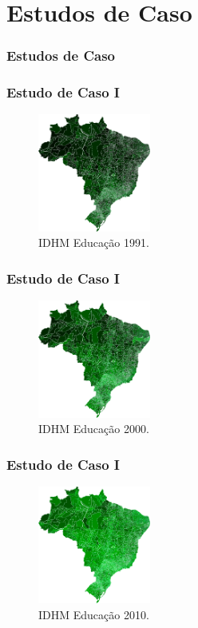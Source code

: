 \documentclass[aspectratio=169]{beamer}
\begin{document}
\section{Estudos de Caso}
\begin{frame}
\frametitle{Estudos de Caso}
\justifying


\end{frame}

\begin{frame}
\frametitle{Estudo de Caso I}
\justifying

\begin{figure}
\centering
\includegraphics[width=0.33\textwidth]{images/educacao-1991.png}
\caption{IDHM Educação 1991.}
\end{figure}


\end{frame}

\begin{frame}
\frametitle{Estudo de Caso I}
\justifying

\begin{figure}
\centering
\includegraphics[width=0.33\textwidth]{images/educacao-2000.png}
\caption{IDHM Educação 2000.}
\end{figure}


\end{frame}

\begin{frame}
\frametitle{Estudo de Caso I}
\justifying

\begin{figure}
\centering
\includegraphics[width=0.33\textwidth]{images/educacao-2010.png}
\caption{IDHM Educação 2010.}
\end{figure}


\end{frame}
\end{document}

